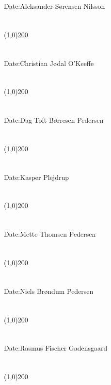 Date:\indent\indent Aleksander Sørensen Nilsson\\\\\\
\indent\line(1,0){200}\\\\\\
\indent Date:\indent\indent Christian Jødal O'Keeffe\\\\\\
\indent\line(1,0){200}\\\\\\
\indent Date:\indent\indent Dag Toft Børresen Pedersen\\\\\\
\indent\line(1,0){200}\\\\\\
\indent Date:\indent\indent  Kasper Plejdrup\\\\\\
\indent\line(1,0){200}\\\\\\
\indent Date:\indent\indent  Mette Thomsen Pedersen\\\\\\
\indent\line(1,0){200}\\\\\\
\indent Date:\indent\indent  Niels Brøndum Pedersen\\\\\\
\indent\line(1,0){200}\\\\\\
\indent Date:\indent\indent  Rasmus Fischer Gadensgaard\\\\\\
\indent\line(1,0){200}\\\\\\
